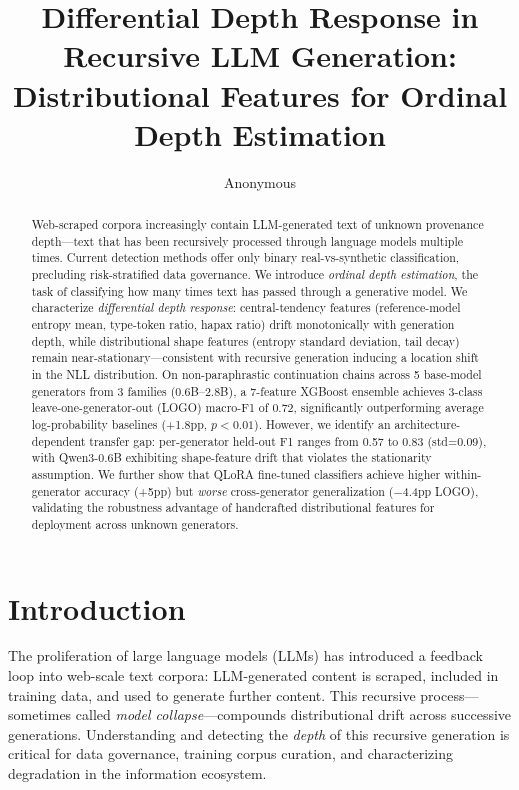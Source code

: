 \documentclass[11pt,a4paper]{article}
\title{Differential Depth Response in Recursive LLM Generation:\\Distributional Features for Ordinal Depth Estimation}
\author{Anonymous}
\begin{document}
\maketitle

\begin{abstract}
Web-scraped corpora increasingly contain LLM-generated text of unknown provenance depth---text that has been recursively processed through language models multiple times. Current detection methods offer only binary real-vs-synthetic classification, precluding risk-stratified data governance. We introduce \emph{ordinal depth estimation}, the task of classifying how many times text has passed through a generative model. We characterize \emph{differential depth response}: central-tendency features (reference-model entropy mean, type-token ratio, hapax ratio) drift monotonically with generation depth, while distributional shape features (entropy standard deviation, tail decay) remain near-stationary---consistent with recursive generation inducing a location shift in the NLL distribution. On non-paraphrastic continuation chains across 5 base-model generators from 3 families (0.6B--2.8B), a 7-feature XGBoost ensemble achieves 3-class leave-one-generator-out (LOGO) macro-F1 of 0.72, significantly outperforming average log-probability baselines (+1.8pp, $p{<}0.01$). However, we identify an architecture-dependent transfer gap: per-generator held-out F1 ranges from 0.57 to 0.83 (std=0.09), with Qwen3-0.6B exhibiting shape-feature drift that violates the stationarity assumption. We further show that QLoRA fine-tuned classifiers achieve higher within-generator accuracy (+5pp) but \emph{worse} cross-generator generalization ($-$4.4pp LOGO), validating the robustness advantage of handcrafted distributional features for deployment across unknown generators.
\end{abstract}

\section{Introduction}

The proliferation of large language models (LLMs) has introduced a feedback loop into web-scale text corpora: LLM-generated content is scraped, included in training data, and used to generate further content. This recursive process---sometimes called \emph{model collapse}---compounds distributional drift across successive generations. Understanding and detecting the \emph{depth} of this recursive generation is critical for data governance, training corpus curation, and characterizing degradation in the information ecosystem.
\end{document}
